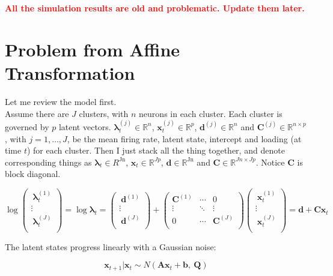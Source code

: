 \documentclass[]{article}
\begin{document}
\textbf{\textcolor{red}{All the simulation results are old and problematic. Update them later.}}

\section{Problem from Affine Transformation}
Let me review the model first.\\
Assume there are \(J\)
clusters, with \(n\) neurons in each cluster. Each cluster is governed
by \(p\) latent vectors. \(\bm{\lambda}_{t}^{(j)} \in \mathbb{R}^{n}\),
\(\mathbf{x}_{t}^{(j)} \in \mathbb{R}^{p}\), \(\mathbf{d}^{(j)} \in \mathbb{R}^{n}\) and
\(\mathbf{C}^{(j)} \in \mathbb{R}^{n \times p}\), with \(j = 1,\ldots,J\), be the
mean firing rate, latent state, intercept and loading (at time $t$) for
each cluster. Then I just stack all the thing together, and denote
corresponding things as \(\bm{\lambda}_{t} \in R^{\text{Jn}}\),
\(\mathbf{x}_{t} \in \mathbb{R}^{Jp}\), \(\mathbf{d} \in \mathbb{R}^{\text{Jn}}\)
and \(\mathbf{C} \in \mathbb{R}^{Jn \times Jp}\). Notice \(\mathbf{C}\) is block
diagonal.

\[\log{\begin{pmatrix}
		\ \bm{\lambda}_{t}^{(1)} \\
		\vdots \\
		\ \bm{\lambda}_{t}^{(J)} \\
	\end{pmatrix} =}\log\bm{\lambda}_{t} = \begin{pmatrix}
	\ \mathbf{d}^{(1)} \\
	\vdots \\
	\ \mathbf{d}^{(J)} \\
\end{pmatrix} + \begin{pmatrix}
	\mathbf{C}^{(1)} & \cdots & 0 \\
	\vdots & \ddots & \vdots \\
	0 & \cdots & \mathbf{C}^{(J)} \\
\end{pmatrix}\begin{pmatrix}
	\ \mathbf{x}_{t}^{(1)} \\
	\vdots \\
	\ \mathbf{x}_{t}^{(J)} \\
\end{pmatrix} = \mathbf{d} + \mathbf{C}\mathbf{x}_{t}\]

The latent states progress linearly with a Gaussian noise:

\[\mathbf{x}_{t + 1}|\mathbf{x}_{t} \sim N(\mathbf{A}\mathbf{x}_{t} + \mathbf{b},\ \mathbf{Q})\]
\end{document}
